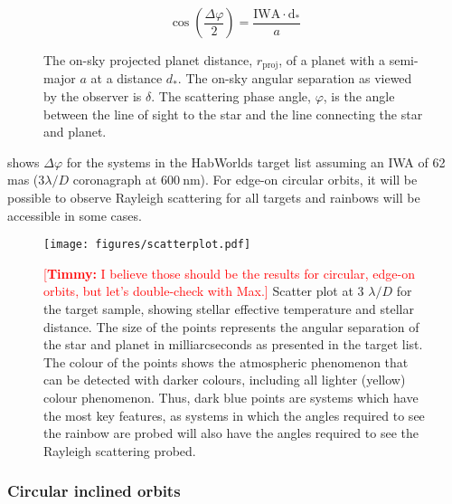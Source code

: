 \documentclass[
    usenatbib,
]{mnras}
\newcommand{\timmy}[1]{\textcolor{red}{[\textbf{Timmy:} #1]}} %
\begin{document}
\begin{equation}
    \label{eq:scattering_angle}
    \cos\left(\dfrac{\Delta \varphi}{2}\right) = \frac{\mathrm{IWA \cdot d_*}}{a}
\end{equation}
 
\begin{figure}
    \centering
    
    \caption{
        The on-sky projected planet distance, $r_\mathrm{proj}$, of a planet with a semi-major $a$ at a distance $d_*$. The on-sky angular separation as viewed by the observer is $\delta$. The scattering phase angle, $\varphi$, is the angle between the line of sight to the star and the line connecting the star and planet.  
    }
    \label{fig:scattering-angle}
\end{figure}

 shows $\Delta \varphi$ for the systems in the HabWorlds target list assuming an IWA of 62 mas ($3 \lambda / D$ coronagraph at $\SI{600}{\nano\meter}$). 
%
%
For edge-on circular orbits, it will be possible to observe Rayleigh scattering for all targets and rainbows will be accessible in some cases.

\begin{figure*}
    \centering
    \texttt{[image: figures/scatterplot.pdf]}
    \caption{
        \timmy{I believe those should be the results for circular, edge-on orbits, but let's double-check with Max.}
        Scatter plot at 3 $\lambda/D$ for the target sample, showing stellar effective temperature and stellar distance. 
        The size of the points represents the angular separation of the star and planet in milliarcseconds as presented in the target list. 
        The colour of the points shows the atmospheric phenomenon that can be detected with darker colours, including all lighter (yellow) colour phenomenon. 
        Thus, dark blue points are systems which have the most key features, as systems in which the angles required to see the rainbow are probed will also have the angles required to see the Rayleigh scattering probed.
    }
    \label{fig:scatterplot}
\end{figure*}


\subsubsection{Circular inclined orbits}
\end{document}
